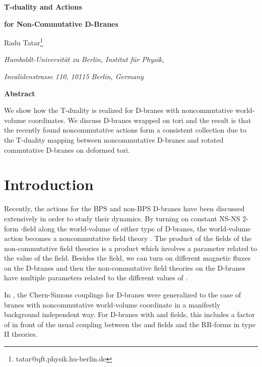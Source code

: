 \documentclass[a4paper,12pt]{article}
\begin{document}
\begin{titlepage}
\vskip 3cm
\centerline{\Large\bf{T-duality and  Actions}} 
\centerline{\Large\bf{for Non-Commutative D-Branes}}
\vskip 1cm
\centerline{Radu Tatar\footnote{tatar@qft.physik.hu-berlin.de}}
\bigskip
\centerline{\it Humboldt-Universit\"at zu Berlin, Institut f\"ur  
Physik,}
\centerline{\it Invalidenstrasse 110, 10115 Berlin, Germany}
\smallskip
\vskip 4cm
\centerline{\bf Abstract}
We show how the T-duality is realized for D-branes with 
noncommutative world-volume coordinates. We discuss D-branes wrapped on 
tori and the result is that
the recently found noncommutative actions form a 
consistent collection due to the T-duality mapping between 
noncommutative D-branes and rotated commutative D-branes on deformed tori. 
\bigskip
\end{titlepage}
\section{Introduction}
Recently, the actions for the BPS and non-BPS D-branes have been discussed
extensively in order to study their dynamics. By turning on constant
NS-NS 2-form \coordHE{}-field along the world-volume of either type of  D-branes, 
the world-volume
action becomes a noncommutative field theory \cite{sch,sw,gms,dmr,kra2,gms1,
sei,kra3,sen1,gms2,kra4}. 
The product of the fields of the non-commutative field theories is a
\myHighlight{$*$}\coordHE{} product which involves a \myHighlight{$\theta$}\coordHE{} parameter related to the value of the
\coordHE{} field.
Besides the \coordHE{} field, 
we can turn on different magnetic fluxes \coordHE{} on the D-branes and then the
non-commutative field theories on the D-branes have multiple 
\myHighlight{$\theta$}\coordHE{} parameters related to the different values of \coordHE{} 
\cite{ot5,nappi,dasy}.

In \cite{ms}, the Chern-Simons couplings for D-branes were generalized to 
the case of branes with noncommutative world-volume coordinate in a manifestly
background independent way. For D-branes with \coordHE{} and \coordHE{} fields, this 
includes a factor of \coordHE{} in front of the usual coupling between 
the \coordHE{} and \coordHE{} fields and the RR-forms in type II theories. 
\end{document}
